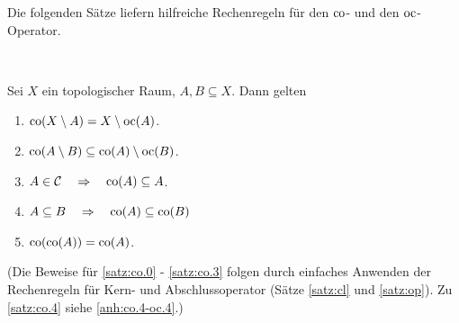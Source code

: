    Die folgenden Sätze liefern hilfreiche Rechenregeln für den $\text{co}$- und den $\text{oc}$-Operator.
    \begin{satz}\label{satz:co} \ \vspace{8pt}

        \noindent
        Sei $X$ ein topologischer Raum, $A, B \subseteq X$. Dann gelten
        \begin{enumerate}
            \item \label{satz:co.0} $\text{co}(X \setminus A) = X \setminus \text{oc}(A)$.
            \item \label{satz:co.1} $\text{co}(A \setminus B) \subseteq \text{co}(A) \setminus \text{oc}(B)$.
            \item \label{satz:co.2} $A \in \mathcal{C} \quad \Rightarrow \quad \text{co}(A) \subseteq A$.
            \item \label{satz:co.3} $A \subseteq B \quad \Rightarrow \quad \text{co}(A) \subseteq \text{co}(B)$
            \item \label{satz:co.4} $\text{co}(\text{co}(A)) = \text{co}(A)$.		
        \end{enumerate}	
        
        (Die Beweise für \ref{satz:co.0} - \ref{satz:co.3} folgen durch einfaches Anwenden der Rechenregeln für Kern- und Abschlussoperator (Sätze \ref{satz:cl} und \ref{satz:op}). Zu \ref{satz:co.4} siehe \ref{anh:co.4-oc.4}.)
    \end{satz}


